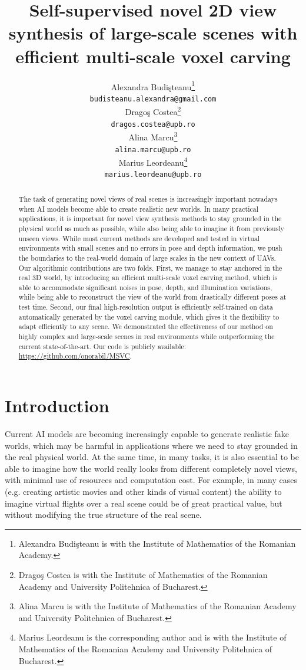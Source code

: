 \documentclass{article}
\title{Self-supervised novel 2D view synthesis of large-scale scenes with efficient multi-scale voxel carving}
\author{%
  Alexandra Budi\c{s}teanu\thanks{Alexandra Budi\c{s}teanu is with the Institute of Mathematics of the Romanian Academy.} \\
  \texttt{budisteanu.alexandra@gmail.com} \\
  \And
  Drago\c{s} Costea\thanks{Drago\c{s} Costea is with the Institute of Mathematics of the Romanian Academy and University Politehnica of Bucharest.}\\
  \texttt{dragos.costea@upb.ro} \\
  \And
  Alina Marcu\thanks{Alina Marcu is with the Institute of Mathematics of the Romanian Academy and University Politehnica of Bucharest.}\\
  \texttt{alina.marcu@upb.ro} \\
  \And
  Marius Leordeanu\thanks{Marius Leordeanu is the corresponding author and is with the Institute of Mathematics of the Romanian Academy and University Politehnica of Bucharest.} \\
  \texttt{marius.leordeanu@upb.ro} \\
}
\begin{document}
\maketitle


\begin{abstract}
The task of generating novel views of real scenes is increasingly important nowadays when AI models become able to create realistic new worlds. In many practical applications, it is important for novel view synthesis methods to stay grounded in the physical world as much as possible, while also being able to imagine it from previously unseen views. While most current methods are developed and tested in virtual environments with small scenes and no errors in pose and depth information, we push the boundaries to the real-world domain of large scales in the new context of UAVs. Our algorithmic contributions are two folds. First, we manage to stay anchored in the real 3D world, by introducing an efficient multi-scale voxel carving method, which is able to accommodate significant noises in pose, depth, and illumination variations, while being able to reconstruct the view of the world from drastically different poses at test time. Second, our final high-resolution output is efficiently self-trained on data automatically generated by the voxel carving module, which gives it the flexibility to adapt efficiently to any scene. We demonstrated the effectiveness of our method on highly complex and large-scale scenes in real environments while outperforming the current state-of-the-art. Our code is publicly available: \url{https://github.com/onorabil/MSVC}.
\end{abstract}

\section{Introduction}
\label{sec:intro}

Current AI models are becoming increasingly capable to generate realistic fake worlds, which may be harmful in applications where we need to stay grounded in the real physical world. At the same time, in many tasks, it is also essential to be able to imagine how the world really looks from different completely novel views, with minimal use of resources and computation cost. For example, in many cases (e.g. creating artistic movies and other kinds of visual content) the ability to imagine virtual flights over a real scene could be of great practical value, but without modifying the true structure of the real scene.
\end{document}
